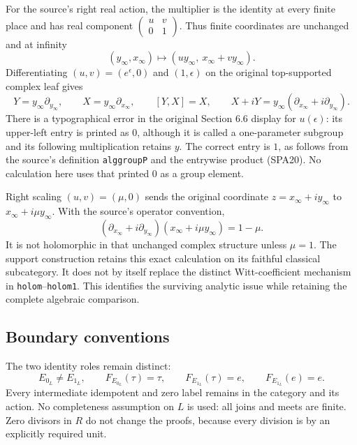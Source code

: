For the source's right real action, the multiplier is
the identity at every finite place and has real component
$\left(\begin{smallmatrix}u&v\\0&1\end{smallmatrix}\right)$.
Thus finite coordinates are unchanged and at infinity
\begin{equation}\tag{SPA25}
(y_\infty,x_\infty)\longmapsto
(u y_\infty,\ x_\infty+v y_\infty).
\end{equation}
Differentiating $(u,v)=(e^\epsilon,0)$ and $(1,\epsilon)$
on the original top-supported complex leaf gives
\[
Y=y_\infty\partial_{y_\infty},\qquad
X=y_\infty\partial_{x_\infty},\qquad [Y,X]=X,\qquad
X+iY=y_\infty(\partial_{x_\infty}+i\partial_{y_\infty}).
\]
There is a typographical error in the original Section 6.6
display for $u(\epsilon)$: its upper-left entry is printed
as $0$, although it is called a one-parameter subgroup
and its following multiplication retains $y$.
The correct entry is $1$, as follows from the source's
definition \texttt{alggroupP} and the entrywise product
(SPA20). No calculation here uses that printed $0$ as
a group element.

Right scaling $(u,v)=(\mu,0)$ sends the original coordinate
$z=x_\infty+i y_\infty$ to $x_\infty+i\mu y_\infty$.
With the source's operator convention,
\begin{equation}\tag{SPA26}
(\partial_{x_\infty}+i\partial_{y_\infty})
 (x_\infty+i\mu y_\infty)=1-\mu.
\end{equation}
It is not holomorphic in that unchanged complex structure
unless $\mu=1$. The support construction retains this exact
calculation on its faithful classical subcategory.
It does not by itself replace the distinct Witt-coefficient
mechanism in \texttt{holom}--\texttt{holom1}.
This identifies the surviving analytic issue while retaining
the complete algebraic comparison.

\subsection{Boundary conventions}

The two identity roles remain distinct:
\begin{equation}\tag{SPA27}
E_{0_L}\ne E_{1_L},\qquad
F_{E_{0_L}}(\tau)=\tau,\qquad
F_{E_{1_L}}(\tau)=e,\qquad F_{E_{1_L}}(e)=e.
\end{equation}
Every intermediate idempotent and zero label remains in
the category and its action. No completeness assumption
on $L$ is used: all joins and meets are finite.
Zero divisors in $R$ do not change the proofs, because
every division is by an explicitly required unit.


